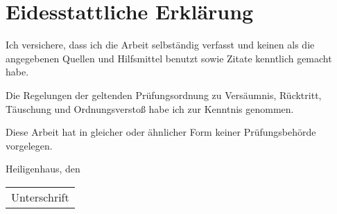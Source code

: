 \section*{Eidesstattliche Erklärung}
%
Ich versichere, dass ich die Arbeit selbständig verfasst und keinen als die angegebenen Quellen und Hilfsmittel benutzt sowie Zitate kenntlich gemacht habe. 
%
\bigskip 

Die Regelungen der geltenden Prüfungsordnung zu Versäumnis, Rücktritt, Täuschung und Ordnungsverstoß habe ich zur Kenntnis genommen. 
%
\bigskip

Diese Arbeit hat in gleicher oder ähnlicher Form keiner Prüfungsbehörde vorgelegen. 
%
\bigskip 

%

\vspace{3cm}
Heiligenhaus, den 
\underline{\hspace*{3cm}}
\hfill 
\begin{tabular}[t]{@{}l@{}}\hline
\hspace*{2.5cm}Unterschrift\hspace*{2.5cm}
\end{tabular}
